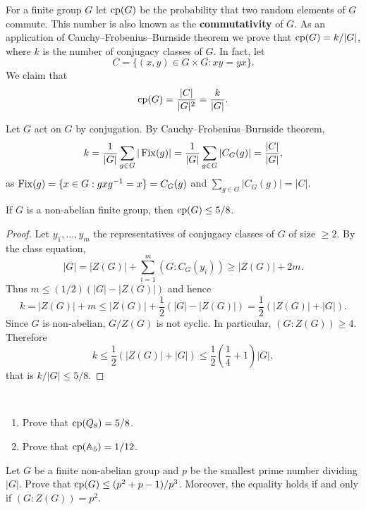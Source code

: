 
For a finite group $G$ let $\operatorname{cp}(G)$ be the probability 
that two random elements of $G$ commute. This number
is also known as the \textbf{commutativity} of $G$. 
As an application of Cauchy--Frobenius--Burnside theorem we
prove that 
$\operatorname{cp}(G)=k/|G|$, where $k$ is the number of conjugacy classes
of $G$. In fact, let 
\[
C=\{(x,y)\in G\times G:xy=yx\}.
\]
We claim that  
    \[
    \operatorname{cp}(G)=\frac{|C|}{|G|^2}=\frac{k}{|G|}.
    \]

Let $G$ act on $G$ by conjugation. 
    By Cauchy--Frobenius--Burnside theorem, 
    \[
    k=\frac{1}{|G|}\sum_{g\in G}|\operatorname{Fix}(g)|=\frac{1}{|G|}\sum_{g\in G}|C_G(g)|=\frac{|C|}{|G|},
    \]
    as $\operatorname{Fix}(g)=\{x\in G:gxg^{-1}=x\}=C_G(g)$ and $\sum_{g\in G}|C_G(g)|=|C|$. 


\begin{theorem}
\label{thm:5/8}
    If $G$ is a non-abelian finite group, then $\operatorname{cp}(G)\leq5/8$.
\end{theorem}

\begin{proof}
%
    Let $y_1,\dots,y_m$ the representatives of conjugacy classes of $G$ 
    of size $\geq2$. By the class equation, 
    \[
    |G|=|Z(G)|+\sum_{i=1}^m(G:C_G(y_i))\geq |Z(G)|+2m.
    \]
    Thus $m\leq(1/2)(|G|-|Z(G)|)$ and hence 
    \[
    k=|Z(G)|+m\leq |Z(G)|+\frac12(|G|-|Z(G)|)=\frac12(|Z(G)|+|G|).
    \]
    Since $G$ is non-abelian, $G/Z(G)$ is not cyclic. In particular, 
    $(G:Z(G))\geq4$. Therefore
    \[
    k\leq\frac12(|Z(G)|+|G|)\leq\frac12\left(\frac14+1\right)|G|,
    \]
    that is $k/|G|\leq 5/8$. 
\end{proof}

\begin{exercise}\
\begin{enumerate}
    \item Prove that $\operatorname{cp}(Q_8)=5/8$. 
    \item Prove that $\operatorname{cp}(\mathbb{A}_5)=1/12$. 
\end{enumerate}
\end{exercise}

\begin{exercise}
    Let $G$ be a finite non-abelian group and $p$ be the smallest prime number
    dividing $|G|$. Prove that $\operatorname{cp}(G)\leq (p^2+p-1)/p^3$. Moreover, 
    the equality holds if and only if $(G:Z(G))=p^2$. 
\end{exercise}

